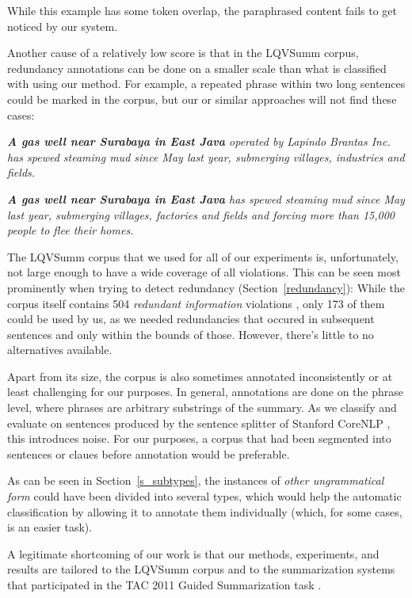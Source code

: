 \documentclass[a4paper,10pt]{scrartcl}
\theoremstyle{style}
\begin{document}
While this example has some token overlap, the paraphrased content fails to get noticed by our system.

Another cause of a relatively low score is that in the LQVSumm corpus, redundancy annotations can be done on a smaller scale than what is classified with using our method. For example, a repeated phrase within two long sentences could be marked in the corpus, but our or similar approaches will not find these cases:

\begin{framed}
\quad\textit{\textbf{A gas well near Surabaya in East Java} operated by Lapindo Brantas Inc. has spewed steaming mud since May last year, submerging villages, industries and fields.}

\quad\textit{\textbf{A gas well near Surabaya in East Java} has spewed steaming mud since May last year, submerging villages, factories and fields and forcing more than 15,000 people to flee their homes.}
\end{framed}

The LQVSumm corpus that we used for all of our experiments is, unfortunately, not large enough to have a wide coverage of all violations. This can be seen most prominently when trying to detect redundancy (Section~\ref{redundancy}): While the corpus itself contains 504 \textit{redundant information} violations \citep[see][]{friedrichlqvsumm}, only 173 of them could be used by us, as we needed redundancies that occured in subsequent sentences and only within the bounds of those.
However, there's little to no alternatives available.

Apart from its size, the corpus is also sometimes annotated inconsistently or at least challenging for our purposes. In general, annotations are done on the phrase level, where phrases are arbitrary substrings of the summary. As we classify and evaluate on sentences produced by the sentence splitter of Stanford CoreNLP \citep{manning-EtAl:2014:P14-5}, this introduces noise. For our purposes, a corpus that had been segmented into sentences or claues before annotation would be preferable.

As can be seen in Section~\ref{s_subtypes}, the instances of \textit{other ungrammatical form} could have been divided into several types, which would help the automatic classification by allowing it to annotate them individually (which, for some cases, is an easier task).

A legitimate shortcoming of our work is that our methods, experiments, and results are tailored to the LQVSumm corpus and to the summarization systems that participated in the TAC 2011 Guided Summarization task \citep{owczarzak2011overview}.
\end{document}
